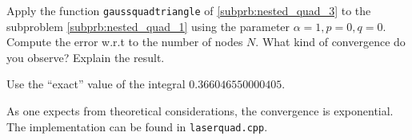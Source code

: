\begin{problem}
\begin{subproblem}[4]
 \end{subproblem}

 \begin{subproblem}[1]
  Apply the function \verb|gaussquadtriangle| of \ref{subprb:nested_quad_3} to the subproblem \ref{subprb:nested_quad_1} using the parameter $\alpha = 1, p = 0, q = 0$. Compute the error w.r.t to the number of nodes $N$. What kind of convergence do you observe? Explain the result.
  
  \begin{hint}
   Use the ``exact'' value of the integral $0.366046550000405$.
  \end{hint}
  
  \cprotEnv \begin{solution}
  As one expects from theoretical considerations, the convergence is exponential. The implementation can be found in \verb|laserquad.cpp|.
  \end{solution}


 \end{subproblem}

 
\end{problem}
